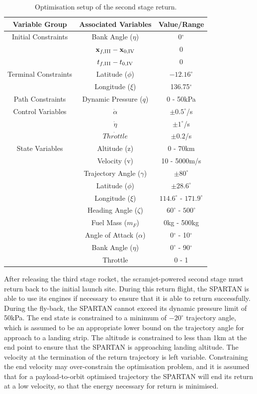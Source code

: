 \begin{table}[ht]
	\centering
	\begin{tabular}{|c|c|c|}
		\hline \textbf{Variable Group}  & \textbf{Associated Variables} & \textbf{Value/Range}\\
		\hline Initial Constraints  & Bank Angle ($\eta$)& 0$^\circ$ \\ 
		& $\textbf{x}_{f,\textrm{\rom{3}}} - \textbf{x}_{0,\textrm{\rom{4}}}$ & 0\\ & $t_{f,\textrm{\rom{3}}} - t_{0,\textrm{\rom{4}}}$ & 0\\
		\hline Terminal Constraints& Latitude ($\phi$)  & $-12.16^\circ$ \\& Longitude ($\xi$) & 136.75$^\circ$\\
		\hline Path Constraints & Dynamic Pressure ($q$)& 0 - 50kPa\\ 
		\hline Control Variables & $\dot{\alpha}$ &  $\pm0.5^\circ$/s\\  & $\dot{\eta}$ &  $\pm1^\circ$/s\\ & $\dot{Throttle}$& $\pm0.2$/s\\
		\hline State Variables& Altitude (z) & 0 - 70km\\ & Velocity (v)& 10 - 5000m/s\\ & Trajectory Angle ($\gamma$)& $\pm80^\circ$\\    & Latitude ($\phi$) &$\pm28.6^\circ$ \\  & Longitude ($\xi$)& $114.6^\circ$ - $171.9^\circ$\\   & Heading Angle ($\zeta$)& $60^\circ$ - $500^\circ$ \\  & Fuel Mass ($m_F$)& 0kg - 500kg\\  & Angle of Attack ($\alpha$)&  0$^\circ$ - 10$^\circ$\\  & Bank Angle ($\eta$)& $0^\circ$ - 90$^\circ$\\  & Throttle & 0 - 1 \\ 
		\hline 
	\end{tabular} 
	\caption{Optimisation setup of the second stage return.}
	
\end{table}

After releasing the third stage rocket, the scramjet-powered second stage must return back to the initial launch site. During this return flight, the SPARTAN is able to use its engines if necessary to ensure that it is able to return successfully. 
During the fly-back, the SPARTAN cannot exceed its dynamic pressure limit of 50kPa. 
 The end state is constrained to a minimum of $-20^\circ$ trajectory angle, which is assumed to be an appropriate lower bound on the trajectory angle for approach to a landing strip. The altitude is constrained to less than 1km at the end point to ensure that the SPARTAN is approaching landing altitude.
 The velocity at the termination of the return trajectory is left variable. Constraining the end velocity may over-constrain the optimisation problem, and it is assumed that for a payload-to-orbit optimised trajectory the SPARTAN will end its return at a low velocity, so that the energy necessary for return is minimised. 
 
